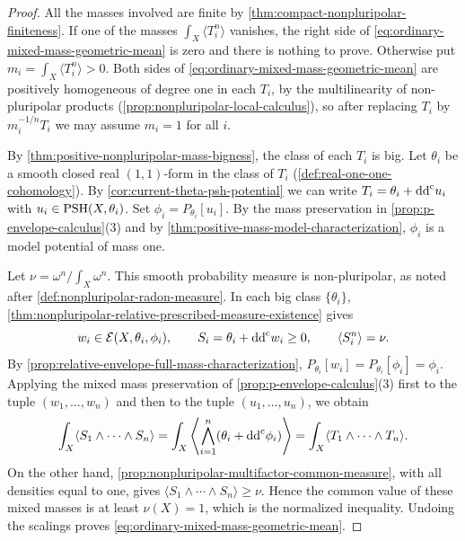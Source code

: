 \begin{proof}
All the masses involved are finite by \cref{thm:compact-nonpluripolar-finiteness}. If one of the masses $\int_X\langle T_i^n\rangle$ vanishes, the right side of \eqref{eq:ordinary-mixed-mass-geometric-mean} is zero and there is nothing to prove. Otherwise put $m_i=\int_X\langle T_i^n\rangle>0$. Both sides of \eqref{eq:ordinary-mixed-mass-geometric-mean} are positively homogeneous of degree one in each $T_i$, by the multilinearity of non-pluripolar products (\cref{prop:nonpluripolar-local-calculus}), so after replacing $T_i$ by $m_i^{-1/n}T_i$ we may assume $m_i=1$ for all $i$.

By \cref{thm:positive-nonpluripolar-mass-bigness}, the class of each $T_i$ is big. Let $\theta_i$ be a smooth closed real $(1,1)$-form in the class of $T_i$ (\cref{def:real-one-one-cohomology}). By \cref{cor:current-theta-psh-potential} we can write $T_i=\theta_i+\mathrm{dd}^{\mathrm{c}} u_i$ with $u_i\in\mathrm{PSH}(X,\theta_i)$. Set $\phi_i=P_{\theta_i}[u_i]$. By the mass preservation in \cref{prop:p-envelope-calculus}(3) and by \cref{thm:positive-mass-model-characterization}, $\phi_i$ is a model potential of mass one.

Let $\nu=\omega^n/\int_X\omega^n$. This smooth probability measure is non-pluripolar, as noted after \cref{def:nonpluripolar-radon-measure}. In each big class $\{\theta_i\}$, \cref{thm:nonpluripolar-relative-prescribed-measure-existence} gives
\[
 w_i\in\mathcal E(X,\theta_i,\phi_i),\qquad
 S_i=\theta_i+\mathrm{dd}^{\mathrm{c}} w_i\geq0,\qquad
                 \langle S_i^n\rangle=\nu.
\]
By \cref{prop:relative-envelope-full-mass-characterization}, $P_{\theta_i}[w_i]=P_{\theta_i}[\phi_i]=\phi_i$. Applying the mixed mass preservation of \cref{prop:p-envelope-calculus}(3) first to the tuple $(w_1,\ldots,w_n)$ and then to the tuple $(u_1,\ldots,u_n)$, we obtain
\[
 \int_X\langle S_1\wedge\cdots\wedge S_n\rangle
 =\int_X\left\langle\bigwedge_{i=1}^n
               (\theta_i+\mathrm{dd}^{\mathrm{c}}\phi_i)\right\rangle
 =\int_X\langle T_1\wedge\cdots\wedge T_n\rangle.
\]
On the other hand, \cref{prop:nonpluripolar-multifactor-common-measure}, with all densities equal to one, gives $\langle S_1\wedge\cdots\wedge S_n\rangle\geq\nu$. Hence the common value of these mixed masses is at least $\nu(X)=1$, which is the normalized inequality. Undoing the scalings proves \eqref{eq:ordinary-mixed-mass-geometric-mean}.


\end{proof}
